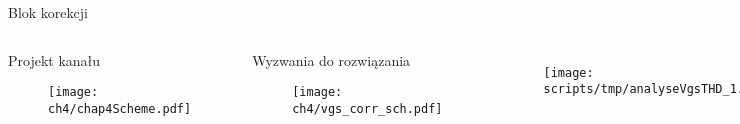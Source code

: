 \begin{frame}{Blok korekcji}
\begin{columns}

    \begin{block}{
        Projekt kanału}
        \begin{figure}[H]
            \centering
            \texttt{[image: ch4/chap4Scheme.pdf]}
        \end{figure} 
        \end{block}

        \begin{block}{
            Wyzwania do rozwiązania}
            \begin{figure}[H]
                \centering
                \texttt{[image: ch4/vgs\_corr\_sch.pdf]} 
            \end{figure}   
            \end{block}



    \begin{columns}

    \begin{figure}[H]
        \centering
        \texttt{[image: scripts/tmp/analyseVgsTHD\_1.pdf]}
    \end{figure} 
    \begin{figure}[H]
        \centering
        \texttt{[image: scripts/tmp/analyseVgsTHD\_2.pdf]}
    \end{figure} 
    \end{columns}   

    \begin{columns}

    \begin{figure}[H]
        \centering
        \texttt{[image: ch4/vgs\_corr0.pdf]}
    \end{figure} 
    \begin{figure}[H]
        \centering
        \texttt{[image: ch4/vgs\_corr1.pdf]}
    \end{figure} 
    \end{columns}   
\end{columns}  
\end{frame}


